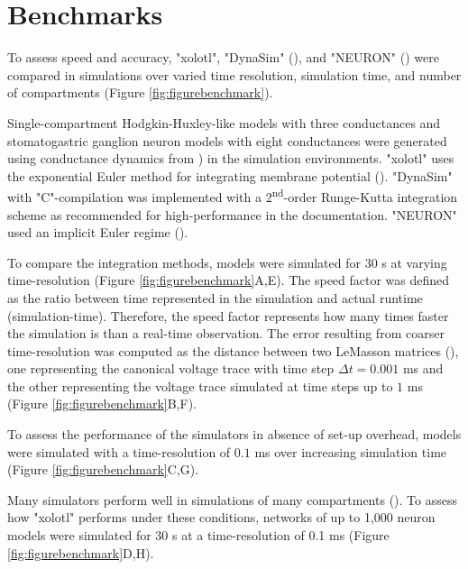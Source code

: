 \documentclass{frontiersSCNS} %
\begin{document}
%
%
%
%
%
%

\section{Benchmarks}
\label{benchmarks}

To assess speed and accuracy, "xolotl", "DynaSim" (\cite{sherfeyDynaSimMATLABToolbox2018}), and "NEURON" (\cite{hinesNEURONSimulationEnvironment1997}) were compared in simulations over varied time resolution,  simulation time, and number of compartments (Figure \ref{fig:figurebenchmark}).

Single-compartment Hodgkin-Huxley-like models with three conductances and stomatogastric ganglion neuron models with eight conductances were generated using conductance dynamics from \cite{liuModelNeuronActivityDependent1998}) in the simulation environments. "xolotl" uses the exponential Euler method for integrating membrane potential (\cite{dayanTheoreticalNeuroscience2001}). "DynaSim" with "C"-compilation was implemented with a 2\textsuperscript{nd}-order Runge-Kutta integration scheme as recommended for high-performance in the documentation. "NEURON" used an implicit Euler regime (\cite{hinesNEURONSimulationEnvironment1997}).

To compare the integration methods, models were simulated for 30 s at varying time-resolution (Figure \ref{fig:figurebenchmark}A,E). The speed factor was defined as the ratio between time represented in the simulation and actual runtime (simulation-time). Therefore, the speed factor represents how many times faster the simulation is than a real-time observation. The error resulting from coarser time-resolution was computed as the distance between two LeMasson matrices (\cite{lemassonIntroductionEquationSolving2000}), one representing the canonical voltage trace with time step $\Delta t = 0.001$ ms and the other representing the voltage trace simulated at time steps up to $1$ ms (Figure \ref{fig:figurebenchmark}B,F).

To assess the performance of the simulators in absence of set-up overhead, models were simulated with a time-resolution of $0.1$ ms over increasing simulation time (Figure \ref{fig:figurebenchmark}C,G).

Many simulators perform well in simulations of many compartments (\cite{bretteSimulationNetworksSpiking2007, sherfeyDynaSimMATLABToolbox2018, vitayANNarchyCodeGeneration2015, delormeSpikeNETEventdrivenSimulation2003}). To assess how "xolotl" performs under these conditions, networks of up to 1,000 neuron models were simulated for 30 s at a time-resolution of 0.1 ms (Figure \ref{fig:figurebenchmark}D,H).
\end{document}
